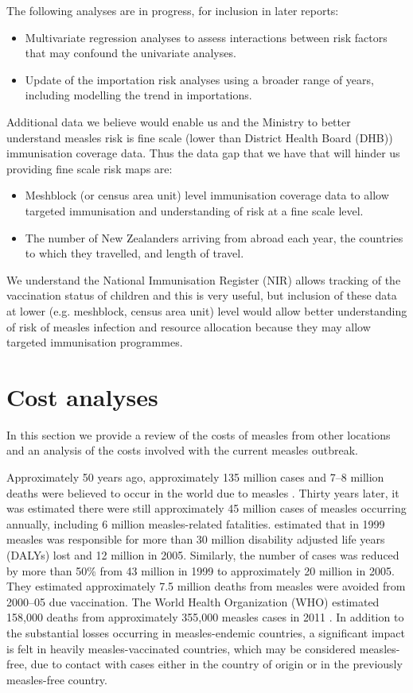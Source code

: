 \documentclass{article}
\begin{document}
The following analyses are in progress, for inclusion in later reports:
\begin{itemize}
\item Multivariate regression analyses to assess interactions between risk factors that may confound the univariate analyses.
\item Update of the importation risk analyses using a broader range of years, including modelling the trend in importations.
\end{itemize}
Additional data we believe would enable us and the Ministry to better understand measles risk is fine scale (lower than District Health Board (DHB)) immunisation coverage data. Thus the data gap that we have that will hinder us providing fine scale risk maps are:
\begin{itemize}
\item Meshblock (or census area unit) level immunisation coverage data to allow targeted immunisation and understanding of risk at a fine scale level.
\item The number of New Zealanders arriving from abroad each year, the countries to which they travelled, and length of travel.
\end{itemize}

We understand the National Immunisation Register (NIR) allows tracking of the vaccination status of children and this is very useful, but inclusion of these data at lower (e.g. meshblock, census area unit) level would allow better understanding of risk of measles infection and resource allocation because they may allow targeted immunisation programmes.

\section{Cost analyses}

In this section we provide a review of the costs of measles from other locations and an analysis of the costs involved with the current measles outbreak.

Approximately 50 years ago, approximately 135 million cases and 7--8 million deaths were believed to occur in the world due to measles \citep{clements4}. Thirty years later, it was estimated there were still approximately 45 million cases of measles occurring annually, including 6 million measles-related fatalities. \citep{wolfson7} estimated that in 1999 measles was responsible for more than 30 million disability adjusted life years (DALYs) lost and 12 million in 2005. Similarly, the number of cases was reduced by more than 50\% from 43 million in 1999 to approximately 20 million in 2005. They estimated approximately 7.5 million deaths from measles were avoided from 2000--05 due vaccination. The World Health Organization (WHO) estimated 158,000 deaths from approximately 355,000 measles cases in 2011 \citep{who13}.  In addition to the substantial losses occurring in measles-endemic countries, a significant impact is felt in heavily measles-vaccinated countries, which may be considered measles-free, due to contact with cases either in the country of origin or in the previously measles-free country.
\end{document}

